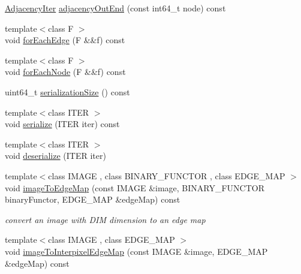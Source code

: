 \begin{DoxyCompactItemize}
\item 
\hyperlink{classnifty_1_1graph_1_1UndirectedGridGraph_3_01DIM_00_01true_01_4_a9779969eb8762908d43eab3d9d3b17b1}{Adjacency\+Iter} \hyperlink{classnifty_1_1graph_1_1UndirectedGridGraph_3_01DIM_00_01true_01_4_a0f11853661461e518fecbf8a18ed9a07}{adjacency\+Out\+End} (const int64\+\_\+t node) const
\item 
{\footnotesize template$<$class F $>$ }\\void \hyperlink{classnifty_1_1graph_1_1UndirectedGridGraph_3_01DIM_00_01true_01_4_ac559f5d9e568eb7979b6f6c978a3cbc1}{for\+Each\+Edge} (F \&\&f) const
\item 
{\footnotesize template$<$class F $>$ }\\void \hyperlink{classnifty_1_1graph_1_1UndirectedGridGraph_3_01DIM_00_01true_01_4_a2754658f397ec50145cea160431543ad}{for\+Each\+Node} (F \&\&f) const
\item 
uint64\+\_\+t \hyperlink{classnifty_1_1graph_1_1UndirectedGridGraph_3_01DIM_00_01true_01_4_a4b12d3a469349695a992fd8d0302556b}{serialization\+Size} () const
\item 
{\footnotesize template$<$class I\+T\+ER $>$ }\\void \hyperlink{classnifty_1_1graph_1_1UndirectedGridGraph_3_01DIM_00_01true_01_4_a89772b8b8c60820c32dab6b1d5156a55}{serialize} (I\+T\+ER iter) const
\item 
{\footnotesize template$<$class I\+T\+ER $>$ }\\void \hyperlink{classnifty_1_1graph_1_1UndirectedGridGraph_3_01DIM_00_01true_01_4_a0b1e57a51d603060ce799156851146cd}{deserialize} (I\+T\+ER iter)
\item 
{\footnotesize template$<$class I\+M\+A\+GE , class B\+I\+N\+A\+R\+Y\+\_\+\+F\+U\+N\+C\+T\+OR , class E\+D\+G\+E\+\_\+\+M\+AP $>$ }\\void \hyperlink{classnifty_1_1graph_1_1UndirectedGridGraph_3_01DIM_00_01true_01_4_a098c2cac9dfa7bd48bf68c89b046014c}{image\+To\+Edge\+Map} (const I\+M\+A\+GE \&image, B\+I\+N\+A\+R\+Y\+\_\+\+F\+U\+N\+C\+T\+OR binary\+Functor, E\+D\+G\+E\+\_\+\+M\+AP \&edge\+Map) const
\begin{DoxyCompactList}\small\item\em convert an image with D\+IM dimension to an edge map \end{DoxyCompactList}\item 
{\footnotesize template$<$class I\+M\+A\+GE , class E\+D\+G\+E\+\_\+\+M\+AP $>$ }\\void \hyperlink{classnifty_1_1graph_1_1UndirectedGridGraph_3_01DIM_00_01true_01_4_abb575399f65b3e51f83e957105bea6a2}{image\+To\+Interpixel\+Edge\+Map} (const I\+M\+A\+GE \&image, E\+D\+G\+E\+\_\+\+M\+AP \&edge\+Map) const

\end{DoxyCompactItemize}
